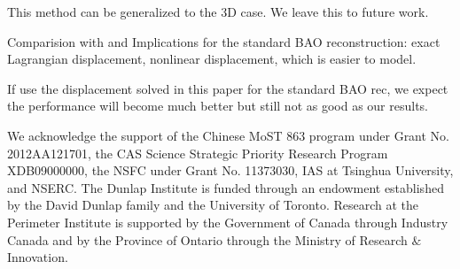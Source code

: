 \documentclass[aps,prd,twocolumn,showpacs,superscriptaddress,groupedaddress,nofootinbib]{revtex4}  %
\begin{document}
This method can be generalized to the 3D case. 
We leave this
to future work.



Comparision with and Implications for the standard BAO reconstruction: exact 
Lagrangian displacement,
nonlinear displacement, which is easier to model.

If use the displacement solved in this paper for the standard BAO rec, we expect
the performance will become much better but still not as good as our results.


We acknowledge the support of the Chinese MoST 863 program under Grant 
No. 2012AA121701, the CAS Science Strategic Priority Research Program 
XDB09000000, the NSFC under Grant No. 11373030, IAS at Tsinghua University, 
 and NSERC.
The Dunlap Institute is funded through an endowment established by the David Dunlap family and the University of Toronto.
Research at the Perimeter Institute is supported by the Government of Canada
through Industry Canada and by the Province of Ontario through the Ministry of
Research $\&$ Innovation.



\end{document}
